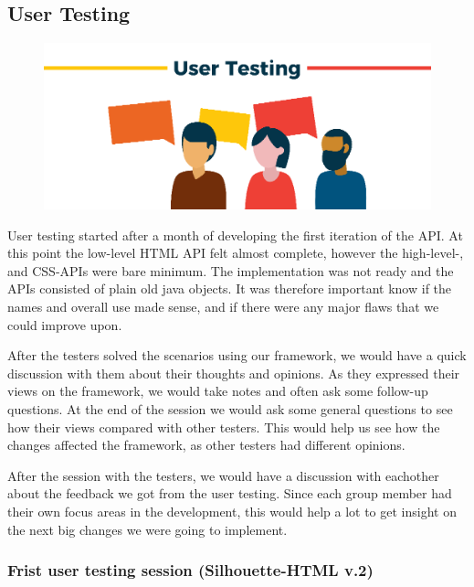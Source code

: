 \documentclass[12pt]{article}
\begin{document}
    \subsection{User Testing}

    \begin{figure}[H]
        \centering
        \includegraphics[scale=0.5]{images/user-testing.png}
    \end{figure}

    User testing started after a month of developing the first iteration of the API. At this point the low-level HTML API felt almost complete, however the high-level-, and CSS-APIs were bare minimum. The implementation was not ready and the APIs consisted of plain old java objects. It was therefore important know if the names and overall use made sense, and if there were any major flaws that we could improve upon.

    After the testers solved the scenarios using our framework, we would have a quick discussion with them about their thoughts and opinions. As they expressed their views on the framework, we would take notes and often ask some follow-up questions. At the end of the session we would ask some general questions to see how their views compared with other testers. This would help us see how the changes affected the framework, as other testers had different opinions.

    After the session with the testers, we would have a discussion with eachother about the feedback we got from the user testing. Since each group member had their own focus areas in the development, this would help a lot to get insight on the next big changes we were going to implement. 

        \subsubsection{Frist user testing session (Silhouette-HTML v.2)}
\end{document}
